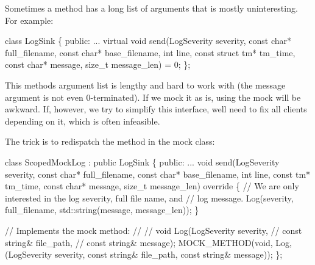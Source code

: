 Sometimes a method has a long list of arguments that is mostly uninteresting. For example\+:


\begin{DoxyCode}
\textcolor{keyword}{class }LogSink \{
 \textcolor{keyword}{public}:
  ...
  \textcolor{keyword}{virtual} \textcolor{keywordtype}{void} send(LogSeverity severity, \textcolor{keyword}{const} \textcolor{keywordtype}{char}* full\_filename,
                    \textcolor{keyword}{const} \textcolor{keywordtype}{char}* base\_filename, \textcolor{keywordtype}{int} line,
                    \textcolor{keyword}{const} \textcolor{keyword}{struct} tm* tm\_time,
                    \textcolor{keyword}{const} \textcolor{keywordtype}{char}* message, \textcolor{keywordtype}{size\_t} message\_len) = 0;
\};
\end{DoxyCode}


This method\textquotesingle{}s argument list is lengthy and hard to work with (the {\ttfamily message} argument is not even 0-\/terminated). If we mock it as is, using the mock will be awkward. If, however, we try to simplify this interface, we\textquotesingle{}ll need to fix all clients depending on it, which is often infeasible.

The trick is to redispatch the method in the mock class\+:


\begin{DoxyCode}
\textcolor{keyword}{class }ScopedMockLog : \textcolor{keyword}{public} LogSink \{
 \textcolor{keyword}{public}:
  ...
  \textcolor{keywordtype}{void} send(LogSeverity severity, \textcolor{keyword}{const} \textcolor{keywordtype}{char}* full\_filename,
                    \textcolor{keyword}{const} \textcolor{keywordtype}{char}* base\_filename, \textcolor{keywordtype}{int} line, \textcolor{keyword}{const} tm* tm\_time,
                    \textcolor{keyword}{const} \textcolor{keywordtype}{char}* message, \textcolor{keywordtype}{size\_t} message\_len)\textcolor{keyword}{ override }\{
    \textcolor{comment}{// We are only interested in the log severity, full file name, and}
    \textcolor{comment}{// log message.}
    Log(severity, full\_filename, std::string(message, message\_len));
  \}

  \textcolor{comment}{// Implements the mock method:}
  \textcolor{comment}{//}
  \textcolor{comment}{//   void Log(LogSeverity severity,}
  \textcolor{comment}{//            const string& file\_path,}
  \textcolor{comment}{//            const string& message);}
  MOCK\_METHOD(\textcolor{keywordtype}{void}, Log,
              (LogSeverity severity, \textcolor{keyword}{const} \textcolor{keywordtype}{string}& file\_path,
               \textcolor{keyword}{const} \textcolor{keywordtype}{string}& message));
\};
\end{DoxyCode}


